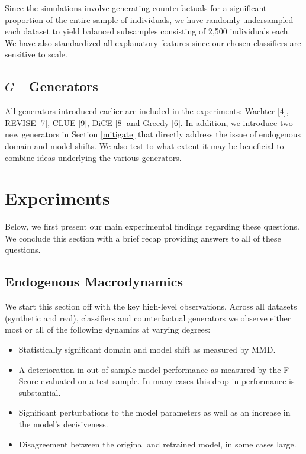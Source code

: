 \documentclass[conference,final,]{IEEEtran}
\providecommand{\tightlist}{%
  \setlength{\itemsep}{0pt}\setlength{\parskip}{0pt}}
\theoremstyle{definition}
\theoremstyle{definition}
\theoremstyle{definition}
\theoremstyle{definition}
\theoremstyle{remark}
\begin{document}
Since the simulations involve generating counterfactuals for a significant proportion of the entire sample of individuals, we have randomly undersampled each dataset to yield balanced subsamples consisting of 2,500 individuals each. We have also standardized all explanatory features since our chosen classifiers are sensitive to scale.

\hypertarget{ggenerators}{%
\subsection{\texorpdfstring{\(G\)---Generators}{G---Generators}}\label{ggenerators}}

All generators introduced earlier are included in the experiments: Wachter \protect\hyperlink{ref-wachter2017counterfactual}{{[}4{]}}, REVISE \protect\hyperlink{ref-joshi2019realistic}{{[}7{]}}, CLUE \protect\hyperlink{ref-antoran2020getting}{{[}9{]}}, DiCE \protect\hyperlink{ref-mothilal2020explaining}{{[}8{]}} and Greedy \protect\hyperlink{ref-schut2021generating}{{[}6{]}}. In addition, we introduce two new generators in Section \ref{mitigate} that directly address the issue of endogenous domain and model shifts. We also test to what extent it may be beneficial to combine ideas underlying the various generators.

\hypertarget{empirical-2}{%
\section{Experiments}\label{empirical-2}}

Below, we first present our main experimental findings regarding these questions. We conclude this section with a brief recap providing answers to all of these questions.

\hypertarget{endogenous-macrodynamics}{%
\subsection{Endogenous Macrodynamics}\label{endogenous-macrodynamics}}

We start this section off with the key high-level observations. Across all datasets (synthetic and real), classifiers and counterfactual generators we observe either most or all of the following dynamics at varying degrees:

\begin{itemize}
\tightlist
\item
  Statistically significant domain and model shift as measured by MMD.
\item
  A deterioration in out-of-sample model performance as measured by the F-Score evaluated on a test sample. In many cases this drop in performance is substantial.
\item
  Significant perturbations to the model parameters as well as an increase in the model's decisiveness.
\item
  Disagreement between the original and retrained model, in some cases large.
\end{itemize}
\end{document}

